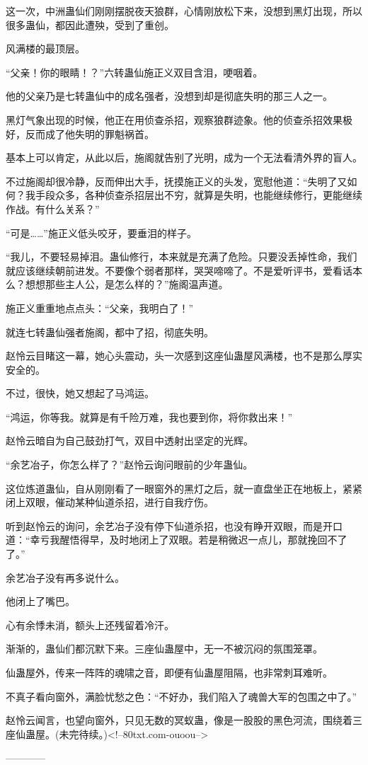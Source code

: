 \begin{this_body}
这一次，中洲蛊仙们刚刚摆脱夜天狼群，心情刚放松下来，没想到黑灯出现，所以很多蛊仙，都因此遭殃，受到了重创。

风满楼的最顶层。

“父亲！你的眼睛！？”六转蛊仙施正义双目含泪，哽咽着。

他的父亲乃是七转蛊仙中的成名强者，没想到却是彻底失明的那三人之一。

黑灯气象出现的时候，他正在用侦查杀招，观察狼群迹象。他的侦查杀招效果极好，反而成了他失明的罪魁祸首。

基本上可以肯定，从此以后，施阁就告别了光明，成为一个无法看清外界的盲人。

不过施阁却很冷静，反而伸出大手，抚摸施正义的头发，宽慰他道：“失明了又如何？我手段众多，各种侦查杀招层出不穷，就算是失明，也能继续修行，更能继续作战。有什么关系？”

“可是……”施正义低头咬牙，要垂泪的样子。

“我儿，不要轻易掉泪。蛊仙修行，本来就是充满了危险。只要没丢掉性命，我们就应该继续朝前进发。不要像个弱者那样，哭哭啼啼了。不是爱听评书，爱看话本么？想想那些主人公，是怎么样的？”施阁温声道。

施正义重重地点点头：“父亲，我明白了！”

就连七转蛊仙强者施阁，都中了招，彻底失明。

赵怜云目睹这一幕，她心头震动，头一次感到这座仙蛊屋风满楼，也不是那么厚实安全的。

不过，很快，她又想起了马鸿运。

“鸿运，你等我。就算是有千险万难，我也要到你，将你救出来！”

赵怜云暗自为自己鼓劲打气，双目中透射出坚定的光辉。

“余艺冶子，你怎么样了？”赵怜云询问眼前的少年蛊仙。

这位炼道蛊仙，自从刚刚看了一眼窗外的黑灯之后，就一直盘坐正在地板上，紧紧闭上双眼，催动某种仙道杀招，进行自我疗伤。

听到赵怜云的询问，余艺冶子没有停下仙道杀招，也没有睁开双眼，而是开口道：“幸亏我醒悟得早，及时地闭上了双眼。若是稍微迟一点儿，那就挽回不了了。”

余艺冶子没有再多说什么。

他闭上了嘴巴。

心有余悸未消，额头上还残留着冷汗。

渐渐的，蛊仙们都沉默下来。三座仙蛊屋中，无一不被沉闷的氛围笼罩。

仙蛊屋外，传来一阵阵的魂啸之音，即便有仙蛊屋阻隔，也非常刺耳难听。

不真子看向窗外，满脸忧愁之色：“不好办，我们陷入了魂兽大军的包围之中了。”

赵怜云闻言，也望向窗外，只见无数的冥蚁蛊，像是一股股的黑色河流，围绕着三座仙蛊屋。(未完待续。)<!--80txt.com-ouoou-->

------------

\end{this_body}

